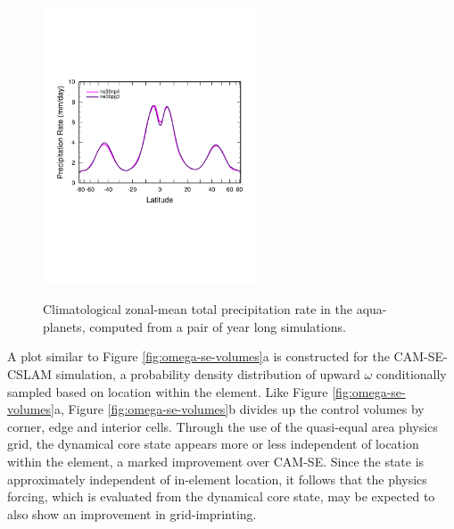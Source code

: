 \documentclass[twocol]{ametsoc}
\begin{document}
\begin{figure}[t]
\noindent\includegraphics[width=15pc,angle=0]{figs/temp_dzonal.pdf}\\
\caption{Climatological zonal-mean total precipitation rate in the aqua-planets, computed from a pair of year long simulations.}
\label{fig:zonal}
\end{figure}

A plot similar to Figure \ref{fig:omega-se-volumes}a is constructed for the CAM-SE-CSLAM simulation, a probability density distribution of upward $\omega$ conditionally sampled based on location within the element. {\color{red}Like Figure \ref{fig:omega-se-volumes}a, Figure \ref{fig:omega-se-volumes}b divides up the control volumes by corner, edge and interior cells. Through the use of the quasi-equal area physics grid, the dynamical core state appears more or less independent of location within the element, a marked improvement over CAM-SE. Since the state is approximately independent of in-element location, it follows that the physics forcing, which is evaluated from the dynamical core state, may be expected to also show an improvement in grid-imprinting.{}} 
\end{document}
